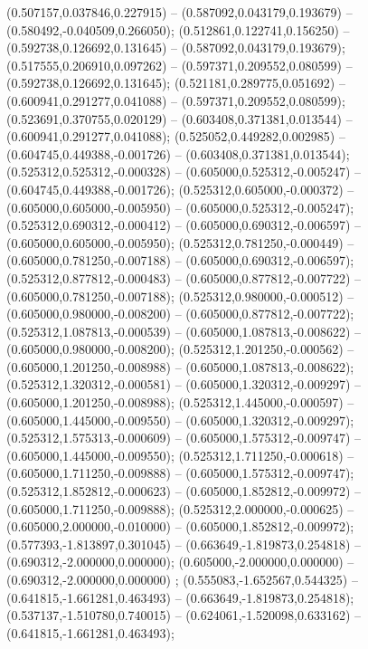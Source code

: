  (0.507157,0.037846,0.227915) -- (0.587092,0.043179,0.193679) -- (0.580492,-0.040509,0.266050);
 (0.512861,0.122741,0.156250) -- (0.592738,0.126692,0.131645) -- (0.587092,0.043179,0.193679);
 (0.517555,0.206910,0.097262) -- (0.597371,0.209552,0.080599) -- (0.592738,0.126692,0.131645);
 (0.521181,0.289775,0.051692) -- (0.600941,0.291277,0.041088) -- (0.597371,0.209552,0.080599);
 (0.523691,0.370755,0.020129) -- (0.603408,0.371381,0.013544) -- (0.600941,0.291277,0.041088);
 (0.525052,0.449282,0.002985) -- (0.604745,0.449388,-0.001726) -- (0.603408,0.371381,0.013544);
 (0.525312,0.525312,-0.000328) -- (0.605000,0.525312,-0.005247) -- (0.604745,0.449388,-0.001726);
 (0.525312,0.605000,-0.000372) -- (0.605000,0.605000,-0.005950) -- (0.605000,0.525312,-0.005247);
 (0.525312,0.690312,-0.000412) -- (0.605000,0.690312,-0.006597) -- (0.605000,0.605000,-0.005950);
 (0.525312,0.781250,-0.000449) -- (0.605000,0.781250,-0.007188) -- (0.605000,0.690312,-0.006597);
 (0.525312,0.877812,-0.000483) -- (0.605000,0.877812,-0.007722) -- (0.605000,0.781250,-0.007188);
 (0.525312,0.980000,-0.000512) -- (0.605000,0.980000,-0.008200) -- (0.605000,0.877812,-0.007722);
 (0.525312,1.087813,-0.000539) -- (0.605000,1.087813,-0.008622) -- (0.605000,0.980000,-0.008200);
 (0.525312,1.201250,-0.000562) -- (0.605000,1.201250,-0.008988) -- (0.605000,1.087813,-0.008622);
 (0.525312,1.320312,-0.000581) -- (0.605000,1.320312,-0.009297) -- (0.605000,1.201250,-0.008988);
 (0.525312,1.445000,-0.000597) -- (0.605000,1.445000,-0.009550) -- (0.605000,1.320312,-0.009297);
 (0.525312,1.575313,-0.000609) -- (0.605000,1.575312,-0.009747) -- (0.605000,1.445000,-0.009550);
 (0.525312,1.711250,-0.000618) -- (0.605000,1.711250,-0.009888) -- (0.605000,1.575312,-0.009747);
 (0.525312,1.852812,-0.000623) -- (0.605000,1.852812,-0.009972) -- (0.605000,1.711250,-0.009888);
 (0.525312,2.000000,-0.000625) -- (0.605000,2.000000,-0.010000) -- (0.605000,1.852812,-0.009972);
 (0.577393,-1.813897,0.301045) -- (0.663649,-1.819873,0.254818) -- (0.690312,-2.000000,0.000000);
 (0.605000,-2.000000,0.000000) -- (0.690312,-2.000000,0.000000) ;
 (0.555083,-1.652567,0.544325) -- (0.641815,-1.661281,0.463493) -- (0.663649,-1.819873,0.254818);
 (0.537137,-1.510780,0.740015) -- (0.624061,-1.520098,0.633162) -- (0.641815,-1.661281,0.463493);
